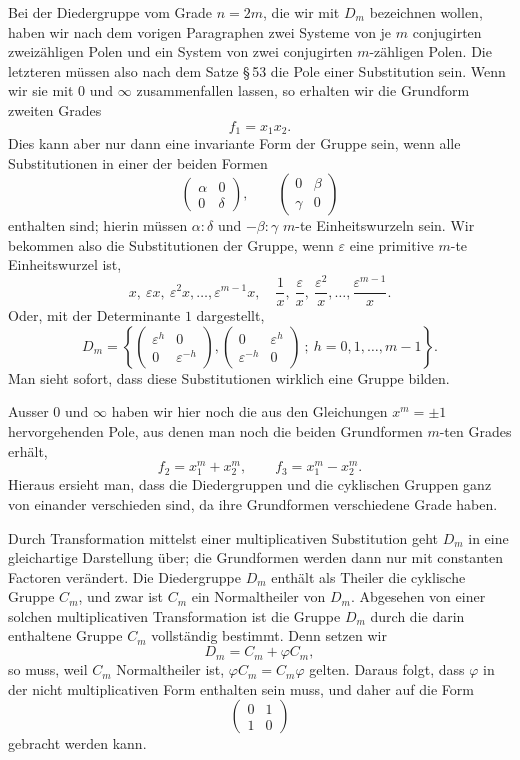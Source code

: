 \documentclass[11pt]{article}
\providecommand{\eps}{\varepsilon}
\providecommand{\eps}{\varepsilon}
\providecommand{\mat}[4]{\begin{pmatrix}#1&#2\\#3&#4\end{pmatrix}}
\providecommand{\mat}[4]{\begin{pmatrix}#1&#2\\#3&#4\end{pmatrix}}
\begin{document}
Bei der Diedergruppe vom Grade $n=2m$, die wir mit $D_m$ bezeichnen wollen, haben wir nach dem vorigen Paragraphen zwei Systeme von je $m$ conjugirten zweizähligen Polen und ein System von zwei conjugirten $m$-zähligen Polen. Die letzteren müssen also nach dem Satze \S\,53 die Pole einer Substitution sein. Wenn wir sie mit $0$ und $\infty$ zusammenfallen lassen, so erhalten wir die Grundform zweiten Grades
\begin{equation}
 f_1=x_1x_2 .
\tag{4}
\end{equation}
Dies kann aber nur dann eine invariante Form der Gruppe sein, wenn alle Substitutionen in einer der beiden Formen
\[
 \mat{\alpha}{0}{0}{\delta},\qquad
 \mat{0}{\beta}{\gamma}{0}
\]
enthalten sind; hierin müssen $\alpha:\delta$ und $-\beta:\gamma$ $m$-te Einheitswurzeln sein. Wir bekommen also die Substitutionen der Gruppe, wenn $\eps$ eine primitive $m$-te Einheitswurzel ist,
\[
x,\ \eps x,\ \eps^2x,\ldots,\eps^{m-1}x,\quad
\frac1x,\ \frac{\eps}{x},\ \frac{\eps^2}{x},\ldots,\frac{\eps^{m-1}}x .
\]
Oder, mit der Determinante $1$ dargestellt,
\begin{equation}
D_m=\left\{
 \mat{\eps^h}{0}{0}{\eps^{-h}},
 \mat{0}{\eps^h}{\eps^{-h}}{0}
 \ ;\ h=0,1,\ldots,m-1
\right\}.
\tag{5}
\end{equation}
Man sieht sofort, dass diese Substitutionen wirklich eine Gruppe bilden.

Ausser $0$ und $\infty$ haben wir hier noch die aus den Gleichungen $x^m=\pm1$ hervorgehenden Pole, aus denen man noch die beiden Grundformen $m$-ten Grades erhält,
\begin{equation}
 f_2=x_1^m+x_2^m,\qquad
 f_3=x_1^m-x_2^m .
\tag{6}
\end{equation}
Hieraus ersieht man, dass die Diedergruppen und die cyklischen Gruppen ganz von einander verschieden sind, da ihre Grundformen verschiedene Grade haben.

Durch Transformation mittelst einer multiplicativen Substitution geht $D_m$ in eine gleichartige Darstellung über; die Grundformen werden dann nur mit constanten Factoren verändert. Die Diedergruppe $D_m$ enthält als Theiler die cyklische Gruppe $C_m$, und zwar ist $C_m$ ein Normaltheiler von $D_m$. Abgesehen von einer solchen multiplicativen Transformation ist die Gruppe $D_m$ durch die darin enthaltene Gruppe $C_m$ vollständig bestimmt. Denn setzen wir
\[
D_m=C_m+\varphi C_m,
\]
so muss, weil $C_m$ Normaltheiler ist, $\varphi C_m=C_m\varphi$ gelten. Daraus folgt, dass $\varphi$ in der nicht multiplicativen Form enthalten sein muss, und daher auf die Form
\[
 \mat{0}{1}{1}{0}
\]
gebracht werden kann.
\end{document}
